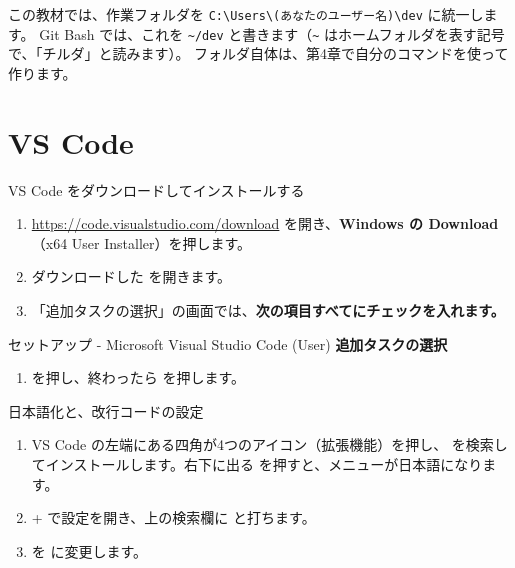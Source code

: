 この教材では、作業フォルダを \verb|C:\Users\(あなたのユーザー名)\dev| に統一します。
Git Bash では、これを \verb|~/dev| と書きます（\verb|~| はホームフォルダを表す記号で、「チルダ」と読みます）。
フォルダ自体は、第4章で自分のコマンドを使って作ります。

\section{VS Code}

\begin{step}{VS Code をダウンロードしてインストールする}
\begin{enumerate}
  \item \url{https://code.visualstudio.com/download} を開き、\textbf{Windows の Download}（x64 User Installer）を押します。
  \item ダウンロードした  を開きます。
  \item 「追加タスクの選択」の画面では、\textbf{次の項目すべてにチェックを入れます。}
\end{enumerate}

\begin{winwin}[0.75\linewidth]{セットアップ - Microsoft Visual Studio Code (User)}
\textbf{追加タスクの選択}\par\smallskip
{}
\end{winwin}

\begin{enumerate}[resume]
  \item {} を押し、終わったら  を押します。
\end{enumerate}
\end{step}

\begin{step}{日本語化と、改行コードの設定}
\begin{enumerate}
  \item VS Code の左端にある四角が4つのアイコン（拡張機能）を押し、 を検索してインストールします。右下に出る  を押すと、メニューが日本語になります。
  \item {}+\key{,} で設定を開き、上の検索欄に  と打ちます。
  \item {} を  に変更します。
\end{enumerate}
\end{step}

